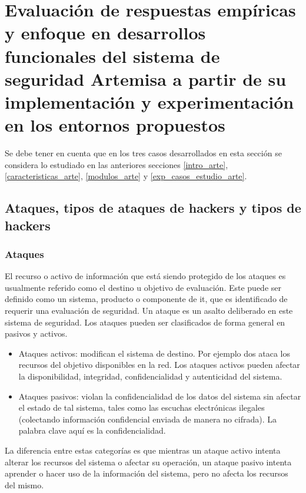 \documentclass[a4paper,12pt]{report}
\begin{document}
\section{Evaluación de respuestas empíricas y enfoque en
desarrollos funcionales del sistema de seguridad Artemisa a
partir de su implementación y experimentación en los entornos
propuestos}
\label{casos_1_2_3}

Se debe tener en cuenta que en los tres casos desarrollados en esta sección se
considera lo estudiado en las anteriores secciones \ref{intro_arte}, \ref{caracteristicas_arte}, 
\ref{modulos_arte} y \ref{exp_casos_estudio_arte}.

\subsection{Ataques, tipos de ataques de hackers y tipos de hackers}

\subsubsection{Ataques}
El recurso o activo de información que está siendo protegido de los ataques es
usualmente referido como el destino u objetivo de evaluación. Este puede ser
definido como un sistema, producto o componente de \ac{it}, que es identificado de
requerir una evaluación de seguridad. Un ataque es un asalto deliberado en este
sistema de seguridad. Los ataques pueden ser clasificados de forma general en
pasivos y activos.

\begin{itemize}
     \item Ataques activos: modifican el sistema de destino. Por
ejemplo \ac{dos} ataca los recursos del objetivo disponibles en la red. Los ataques
activos pueden afectar la disponibilidad, integridad, confidencialidad y
autenticidad del sistema. 

    \item Ataques pasivos: violan la confidencialidad de los datos
del sistema sin afectar el estado de tal sistema, tales como las escuchas
electrónicas ilegales (colectando información confidencial enviada de manera no
cifrada). La palabra clave aquí es la confidencialidad.
\end{itemize}

La diferencia entre estas categorías es que mientras un ataque activo intenta
alterar los recursos del sistema o afectar su operación, un ataque pasivo
intenta aprender o hacer uso de la información del sistema, pero no afecta los
recursos del mismo.\\
\end{document}
